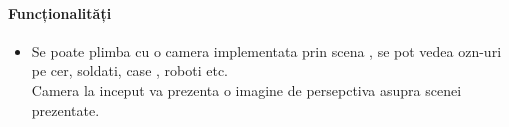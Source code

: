 \paragraph{ Funcționalități}
\begin{itemize}
\item
	\tab Se poate plimba cu o camera implementata prin scena , se pot vedea ozn-uri pe cer, soldati, case , roboti etc.\\
	\tab Camera la inceput va prezenta o imagine de persepctiva asupra scenei prezentate.\\
\end{itemize}
